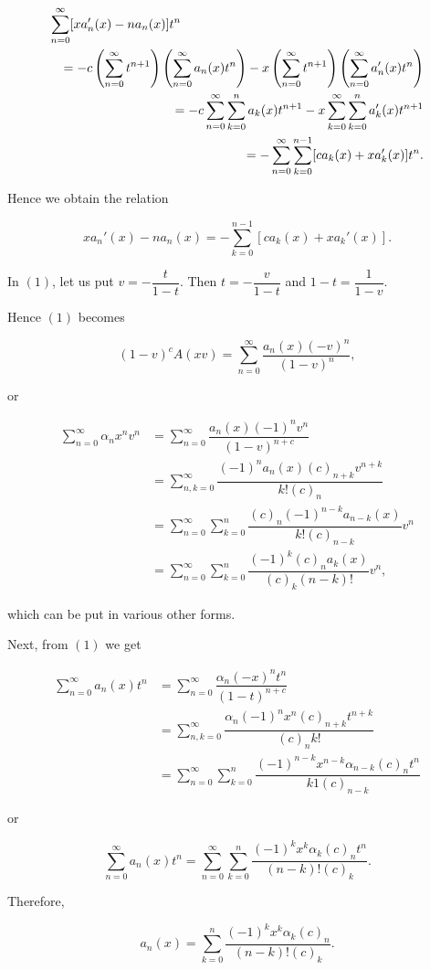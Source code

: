 \begin{solution}
\begin{eqnarray*}
\lefteqn{\displaystyle\sum_{n=0}^{\infty} [x a_n'(x) - n a_n(x)]t^n} \\
& &= -c \left( \displaystyle\sum_{n=0}^{\infty} t^{n+1} \right) \left( \displaystyle\sum_{n=0}^{\infty} a_n(x) t^n \right) - x \left( \displaystyle\sum_{n=0}^{\infty} t^{n+1} \right) \left( \displaystyle\sum_{n=0}^{\infty} a_n'(x) t^n \right) \\
&&= -c \displaystyle\sum_{n=0}^{\infty} \displaystyle\sum_{k=0}^n a_k(x) t^{n+1} - x \displaystyle\sum_{k=0}^{\infty} \displaystyle\sum_{k=0}^n a_k'(x) t^{n+1} \\
&&= - \displaystyle\sum_{n=0}^{\infty} \displaystyle\sum_{k=0}^{n-1} [c a_k(x) + x a_k'(x) ] t^n.
\end{eqnarray*}

Hence we obtain the relation

$$xa_n'(x) - na_n(x) = - \displaystyle\sum_{k=0}^{n-1} [c a_k(x) + x a_k'(x)].$$

In $(1)$, let us put $v = -\dfrac{t}{1-t}$. Then $t = -\dfrac{v}{1-t}$ and $1-t = \dfrac{1}{1-v}$.

Hence $(1)$ becomes 

$$(1-v)^c A(xv) = \displaystyle\sum_{n=0}^{\infty} \dfrac{a_n(x) (-v)^n}{(1-v)^n},$$

or

$$\begin{array}{ll}
\displaystyle\sum_{n=0}^{\infty} \alpha_n x^n v^n &= \displaystyle\sum_{n=0}^{\infty} \dfrac{a_n(x) (-1)^n v^n}{(1-v)^{n+c}} \\
&= \displaystyle\sum_{n,k=0}^{\infty} \dfrac{(-1)^n a_n(x) (c)_{n+k} v^{n+k}}{k! (c)_n} \\
&= \displaystyle\sum_{n=0}^{\infty} \displaystyle\sum_{k=0}^n \dfrac{(c)_n (-1)^{n-k} a_{n-k}(x)}{k! (c)_{n-k}} v^n \\
&= \displaystyle\sum_{n=0}^{\infty} \displaystyle\sum_{k=0}^n \dfrac{(-1)^k (c)_n a_k(x)}{(c)_k (n-k)!} v^n,
\end{array}$$

which can be put in various other forms.

Next, from $(1)$ we get

$$\begin{array}{ll}
\displaystyle\sum_{n=0}^{\infty} a_n(x) t^n &= \displaystyle\sum_{n=0}^{\infty} \dfrac{\alpha_n (-x)^n t^n}{(1-t)^{n+c}} \\
&= \displaystyle\sum_{n,k=0}^{\infty} \dfrac{\alpha_n (-1)^n x^n(c)_{n+k} t^{n+k}}{(c)_n k!} \\
&= \displaystyle\sum_{n=0}^{\infty} \displaystyle\sum_{k=0}^n \dfrac{(-1)^{n-k} x^{n-k} \alpha_{n-k} (c)_n t^n}{k1 (c)_{n-k}}
\end{array}$$

or

$$\displaystyle\sum_{n=0}^{\infty} a_n(x) t^n = \displaystyle\sum_{n=0}^{\infty} \displaystyle\sum_{k=0}^n \dfrac{(-1)^k x^k \alpha_k (c)_n t^n}{(n-k)! (c)_k}.$$

Therefore,

$$a_n(x) = \displaystyle\sum_{k=0}^n \dfrac{(-1)^k x^k \alpha_k (c)_n}{(n-k)! (c)_k}.$$
\end{solution}